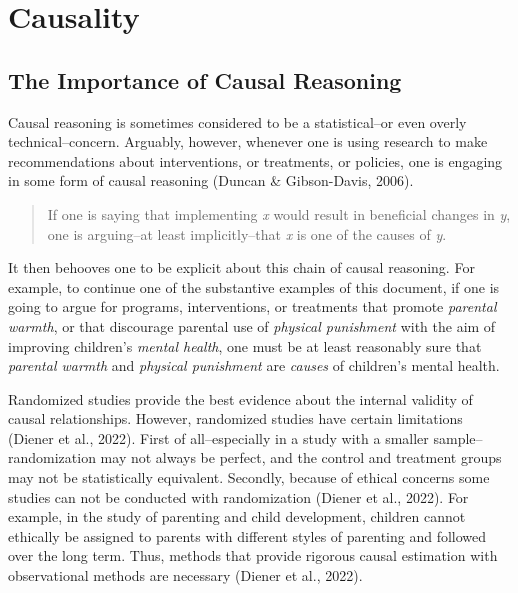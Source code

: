 \documentclass[
  letterpaper,
  DIV=11,
  numbers=noendperiod]{scrreprt}
\begin{document}
\hypertarget{causality}{%
\section{Causality}\label{causality}}

\hypertarget{the-importance-of-causal-reasoning}{%
\subsection{The Importance of Causal
Reasoning}\label{the-importance-of-causal-reasoning}}

Causal reasoning is sometimes considered to be a statistical--or even
overly technical--concern. Arguably, however, whenever one is using
research to make recommendations about interventions, or treatments, or
policies, one is engaging in some form of causal reasoning (Duncan \&
Gibson-Davis, 2006).

\begin{quote}
If one is saying that implementing \emph{x} would result in beneficial
changes in \emph{y}, one is arguing--at least implicitly--that \emph{x}
is one of the causes of \emph{y}.
\end{quote}

It then behooves one to be explicit about this chain of causal
reasoning. For example, to continue one of the substantive examples of
this document, if one is going to argue for programs, interventions, or
treatments that promote \emph{parental warmth}, or that discourage
parental use of \emph{physical punishment} with the aim of improving
children's \emph{mental health}, one must be at least reasonably sure
that \emph{parental warmth} and \emph{physical punishment} are
\emph{causes} of children's mental health.

Randomized studies provide the best evidence about the internal validity
of causal relationships. However, randomized studies have certain
limitations (Diener et al., 2022). First of all--especially in a study
with a smaller sample--randomization may not always be perfect, and the
control and treatment groups may not be statistically equivalent.
Secondly, because of ethical concerns some studies can not be conducted
with randomization (Diener et al., 2022). For example, in the study of
parenting and child development, children cannot ethically be assigned
to parents with different styles of parenting and followed over the long
term. Thus, methods that provide rigorous causal estimation with
observational methods are necessary (Diener et al., 2022).
\end{document}
